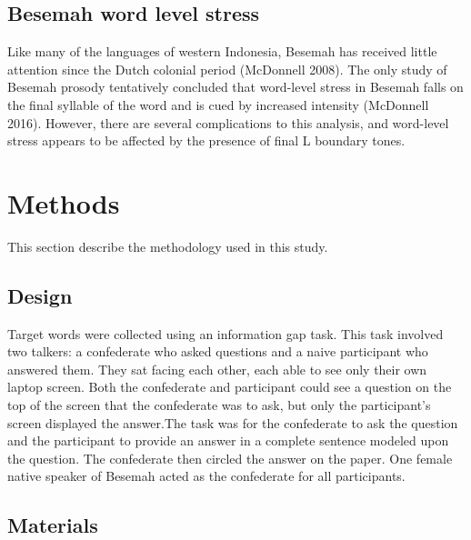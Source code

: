 \documentclass[]{article}
\begin{document}
\subsection{Besemah word level stress}\label{besemah-word-level-stress}

Like many of the languages of western Indonesia, Besemah has received
little attention since the Dutch colonial period (McDonnell 2008). The
only study of Besemah prosody tentatively concluded that word-level
stress in Besemah falls on the final syllable of the word and is cued by
increased intensity (McDonnell 2016). However, there are several
complications to this analysis, and word-level stress appears to be
affected by the presence of final L boundary tones.

\section{Methods}\label{methods}

This section describe the methodology used in this study.

\subsection{Design}\label{design}

Target words were collected using an information gap task. This task
involved two talkers: a confederate who asked questions and a naive
participant who answered them. They sat facing each other, each able to
see only their own laptop screen. Both the confederate and participant
could see a question on the top of the screen that the confederate was
to ask, but only the participant's screen displayed the answer.The task
was for the confederate to ask the question and the participant to
provide an answer in a complete sentence modeled upon the question. The
confederate then circled the answer on the paper. One female native
speaker of Besemah acted as the confederate for all participants.

\subsection{Materials}\label{materials}
\end{document}
